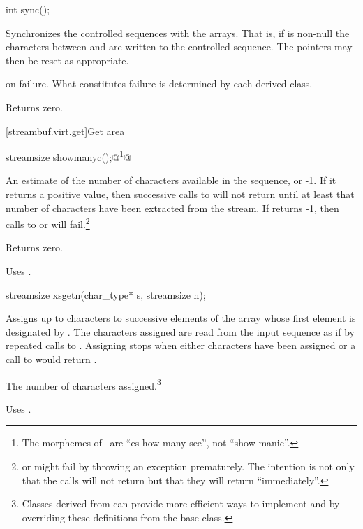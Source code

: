 %
\begin{itemdecl}
int sync();
\end{itemdecl}

\begin{itemdescr}
\pnum
\effects
Synchronizes the controlled sequences with the arrays.
That is, if
is non-null the characters between
and
are written to the controlled sequence.
The pointers may then be reset as appropriate.

\pnum
\returns
{} on failure.
What constitutes failure is determined by each derived class.

\pnum
{}
Returns zero.
\end{itemdescr}

[streambuf.virt.get]{Get area}

%
\begin{itemdecl}
streamsize showmanyc();@\footnote{\textrm{The morphemes of \
are ``es-how-many-see'', not ``show-manic''.}}@
\end{itemdecl}

\begin{itemdescr}
\pnum
\returns
An estimate of the number of
characters available in the sequence, or -1.
If it returns
a positive value, then successive calls to
will not return
until at least that number of characters have been
extracted from the stream.
If
returns -1, then calls to
or
will fail.\footnote{
or
might fail by throwing an exception prematurely.
The intention is not only that the calls will not return
but that they will return ``immediately''.}

\pnum
{}
Returns zero.

\pnum
\remarks
Uses
.
\end{itemdescr}

\indexlibrarymember{xsgetn}{basic_streambuf}%
\begin{itemdecl}
streamsize xsgetn(char_type* s, streamsize n);
\end{itemdecl}

\begin{itemdescr}
\pnum
\effects
Assigns up to  characters to successive elements of
the array whose first element is designated by .
The characters assigned are read from the input sequence as if
by repeated calls to
.
Assigning stops when either  characters
have been assigned or a call to
would return
.

\pnum
\returns
The number of characters assigned.\footnote{Classes derived from
\tcode{basic_streambuf}
can provide more efficient ways to implement
and
by overriding these definitions from the base class.}

\pnum
\remarks
Uses
.
\end{itemdescr}

